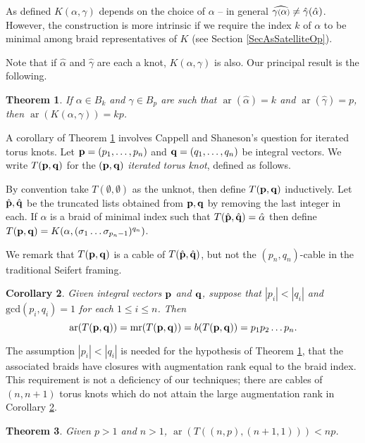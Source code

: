 \documentclass[11pt]{amsart}
\def\s{{\sigma}}
\def\ar{\operatorname{ar}}
\def\mr{\operatorname{mr}}
\newcommand*{\smallp}[1]{\scalebox{.75}{\ensuremath#1}}
\newtheorem{thm}{Theorem}[section]
\newtheorem{cor}[thm]{Corollary}
\theoremstyle{definition}
\begin{document}
As defined $K(\alpha,\gamma)$ depends on the choice of $\alpha$ {--} in general $\widehat{\gamma\smallp(\alpha\smallp)} \ne \hat{\gamma}(\hat{\alpha})$. However, the construction is more intrinsic if we require the index $k$ of $\alpha$ to be minimal among braid representatives of $K$ (see Section \ref{SecAsSatelliteOp}). 

Note that if $\hat{\alpha}$ and $\hat{\gamma}$ are each a knot, $K(\alpha,\gamma)$ is also. Our principal result is the following.

\begin{thm}\label{main}
If $\alpha\in B_k$ and $\gamma\in B_p$ are such that $\ar(\hat{\alpha})=k$ and $\ar(\hat{\gamma})=p$, then $\ar(K(\alpha,\gamma))=kp$.
\end{thm}

A corollary of Theorem \ref{main} involves Cappell and Shaneson's question for iterated torus knots. Let ${\bf p}=(p_1,\ldots,p_n)$ and ${\bf q}=(q_1,\ldots,q_n)$ be integral vectors. We write $T({\bf p},{\bf q})$ for the $({\bf p},{\bf q})$ \emph{iterated torus knot}, defined as follows. 

By convention take $T(\emptyset,\emptyset)$ as the unknot, then define $T({\bf p},{\bf q})$ inductively. Let $\hat{\bf p}, \hat{\bf q}$ be the truncated lists obtained from ${\bf p},{\bf q}$ by removing the last integer in each. If $\alpha$ is a braid of minimal index such that $T(\hat{\bf p},\hat{\bf q}) = \hat{\alpha}$ then define $T({\bf p},{\bf q}) = K(\alpha,(\s_1\ldots\s_{p_n-1})^{q_n})$. 

We remark that $T({\bf p},{\bf q})$ is a cable of $T(\hat{\bf p},\hat{\bf q})$, but not the $(p_n,q_n)$-cable in the traditional Seifert framing.

\begin{cor}\label{cor:iteratedCables}
Given integral vectors ${\bf p}$ and ${\bf q}$, suppose that $|p_i|<|q_i|$ and $\text{gcd}(p_i,q_i)=1$ for each $1\le i\le n$. Then 
      \[\ar(T({\bf p},{\bf q}))=\mr(T({\bf p},{\bf q})) = b(T({\bf p},{\bf q}))=p_1p_2\ldots p_n.\]
\end{cor}

The assumption $|p_i|<|q_i|$ is needed for the hypothesis of Theorem \ref{main}, that the associated braids have closures with augmentation rank equal to the braid index. This requirement is not a deficiency of our techniques; there are cables of $(n,n+1)$ torus knots which do not attain the large augmentation rank in Corollary \ref{cor:iteratedCables}.

\begin{thm}\label{ThmNNPlus1}Given $p>1$ and $n>1$, $\ar(T((n,p),(n+1,1))) < np$.
\end{thm}
\end{document}
